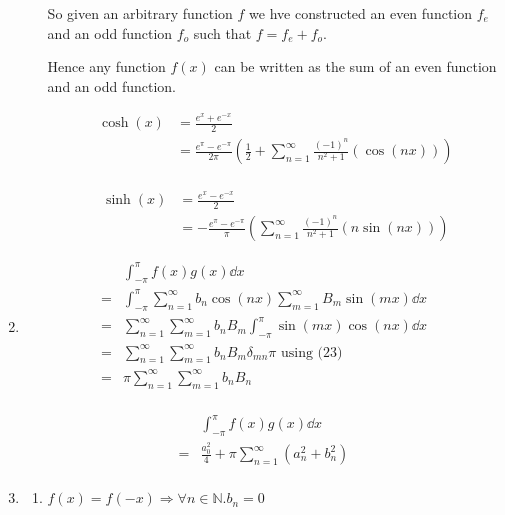\documentclass[10pt,\jkfside,a4paper]{article}
\begin{document}
\begin{enumerate}
\begin{enumerate}
So given an arbitrary function $f$ we hve constructed an even function $f_e$ and an odd 
function $f_o$ such that $f = f_e + f_o$.

Hence any function $f(x)$ can be written as the sum of an even function and an odd function.

\vspace{0.5cm}

\[
\begin{split}
\cosh(x) &= \frac{e^x + e^{-x}}{2} \\
		 &= \frac{e^\pi - e^{-\pi}}{2\pi}\left(\frac{1}{2} + \sum^\infty_{n=1}\frac{(-1)^n}{n^2 + 1}(\cos(nx))\right) \\
\end{split}
\]

\[
\begin{split}
\sinh(x) &= \frac{e^x - e^{-x}}{2} \\
		 &= -\frac{e^\pi - e^{-\pi}}{\pi}\left(\sum^\infty_{n=1}\frac{(-1)^n}{n^2 + 1}(n\sin(nx))\right)
\end{split}
\]

\end{enumerate}

\item 

\[
\begin{split}
 & \int^\pi_{-\pi} f(x)g(x) \dd{x} \\
=& \int^\pi_{-\pi} \sum^\infty_{n=1}b_n\cos(nx)\sum^\infty_{m=1}B_m\sin(mx) \dd{x} \\
=& \sum^\infty_{n=1}\sum^\infty_{m=1}b_nB_m\int^\pi_{-\pi}\sin(mx)\cos(nx) \dd{x} \\
=& \sum^\infty_{n=1}\sum^\infty_{m=1}b_nB_m\delta_{mn}\pi \text{ using (23)} \\
=& \pi\sum^\infty_{n=1}\sum^\infty_{m=1}b_nB_n \\
\end{split}
\]

\[
\begin{split}
 & \int^\pi_{-\pi} f(x)g(x) \dd{x} \\
=& \frac{a_0^2}{4} + \pi\sum^\infty_{n=1}(a^2_n + b^2_n) \\
\end{split}
\]

\item 

\begin{enumerate}

\item \label{fxequalsfminusx} $f(x) = f(-x) \Longrightarrow \forall n \in \mathbb{N}. b_n = 0$


\end{enumerate}
\end{enumerate}
\end{document}
